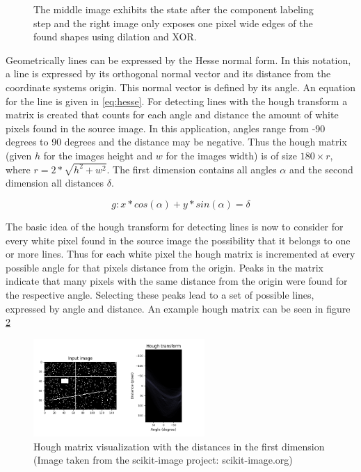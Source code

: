 \documentclass{report}
\begin{document}
\begin{figure}
\begin{subfigure}[t]{0.316\textwidth}
  \end{subfigure}
  \caption{The middle image exhibits the state after the component
    labeling step and the right image only exposes one pixel wide
    edges of the found shapes using dilation and XOR.}
  \label{img:dilation_xor}
\end{figure}

Geometrically lines can be expressed by the Hesse normal form. In this
notation, a line is expressed by its orthogonal normal vector and its
distance from the coordinate systems origin. This normal vector is
defined by its angle. An equation for the line is given in
\ref{eq:hesse}. For detecting lines with the hough transform a matrix
is created that counts for each angle and distance the amount of white
pixels found in the source image. In this application, angles range
from -90 degrees to 90 degrees and the distance may be negative. Thus
the hough matrix (given \( h \) for the images height and \( w \) for
the images width) is of size \( 180 \times r \), where \( r = 2 *
\sqrt{h^2 + w^2} \). The first dimension contains all angles \( \alpha
\) and the second dimension all distances \( \delta \).

\begin{equation}\label{eq:hesse}
  g: x * cos(\alpha) + y * sin(\alpha) = \delta
\end{equation}

The basic idea of the hough transform for detecting lines is now to
consider for every white pixel found in the source image the
possibility that it belongs to one or more lines. Thus for each white
pixel the hough matrix is incremented at every possible angle for that
pixels distance from the origin. Peaks in the matrix indicate that
many pixels with the same distance from the origin were found for the
respective angle. Selecting these peaks lead to a set of possible
lines, expressed by angle and distance. An example hough matrix can be
seen in figure \ref{img:hough}

\begin{figure}
  \centering
    \includegraphics[width=0.58\textwidth]{src/hough_tf}
  \caption{Hough matrix visualization with the distances in the
    first dimension (Image taken from the scikit-image project:
    scikit-image.org)}
  \label{img:hough}
\end{figure}
\end{document}
